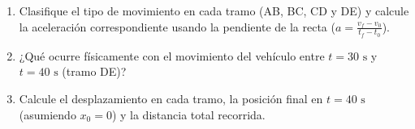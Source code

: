 \documentclass[11pt, letterpaper]{article}
\newif\ifmostrarrespuestas
\newcommand{\respuesta}[1]{
	\ifmostrarrespuestas
	\par\vspace{0.2cm}
	\begin{tcolorbox}[colback=blue!5!white, colframe=valblue, boxrule=0.5pt, arc=1mm, left=2mm, right=2mm, top=1.5mm, bottom=1.5mm]
		\footnotesize \textbf{\textcolor{valblue}{Solución:}} \textcolor{blue!80!black}{#1}
	\end{tcolorbox}
	\vspace{0.2cm}
	\fi
}
\begin{document}
\begin{enumerate}[leftmargin=*, itemsep=0.6cm]
		\begin{enumerate}[label=\alph*., itemsep=0.2cm]
			\item Clasifique el tipo de movimiento en cada tramo (AB, BC, CD y DE) y calcule la aceleración correspondiente usando la pendiente de la recta ($a = \frac{v_f - v_0}{t_f - t_0}$).
			\item ¿Qué ocurre físicamente con el movimiento del vehículo entre $t = 30\text{ s}$ y $t = 40\text{ s}$ (tramo DE)?
			\item Calcule el desplazamiento en cada tramo, la posición final en $t = 40\text{ s}$ (asumiendo $x_0 = 0$) y la distancia total recorrida.
		\end{enumerate}
		\respuesta{
			\textbf{a)} \textbf{AB:} $\text{MUA}(+)$, $a_{AB} = \frac{25-10}{10-0} = \mathbf{1.5\text{ m/s}^2}$. \quad \textbf{BC:} $\text{MU}$, $a_{BC} = \frac{25-25}{25-10} = \mathbf{0\text{ m/s}^2}$.\\
			\textbf{CD:} $\text{MUA}(-)$, $a_{CD} = \frac{0-25}{30-25} = \mathbf{-5\text{ m/s}^2}$. \quad \textbf{DE:} $\text{MUA}$ en sentido negativo, $a_{DE} = \frac{-20-0}{40-30} = \mathbf{-2\text{ m/s}^2}$.\\[0.1cm]
			\textbf{b)} En $t=30\text{ s}$ el vehículo se detiene ($v=0$) e invierte su sentido de marcha, acelerando en reversa (en contra del sentido positivo de referencia) hasta alcanzar una velocidad de $-20\text{ m/s}$.\\[0.1cm]
			\textbf{c)} $x_{AB} = 10(10) + \frac{1.5(10)^2}{2} = \mathbf{175\text{ m}}$; \quad $x_{BC} = 25(15) = \mathbf{375\text{ m}}$; \quad $x_{CD} = 25(5) + \frac{(-5)(5)^2}{2} = \mathbf{62.5\text{ m}}$; \quad $\Delta x_{DE} = 0(10) + \frac{(-2)(10)^2}{2} = \mathbf{-100\text{ m}}$.\\
			\textbf{Posición final:} $x_f = 175 + 375 + 62.5 - 100 = \mathbf{512.5\text{ m}}$. \quad \textbf{Distancia total:} $d = 175 + 375 + 62.5 + 100 = \mathbf{712.5\text{ m}}$.
		}
		

\end{enumerate}
\end{document}
